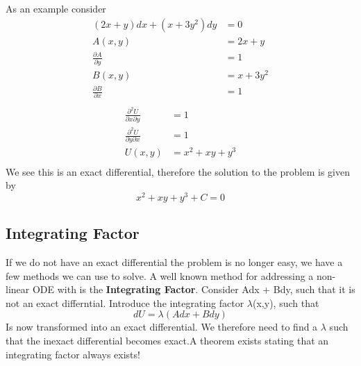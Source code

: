 \documentclass{article}
\newcommand{\be}{\begin{equation}}
\newcommand{\ee}{\end{equation}}
\newcommand{\pd}{\partial}
\begin{document}
As an example consider
\be
\begin{split}
(2x+y)dx + (x+3y^2)dy &= 0 \\
A(x,y) & = 2x+y  \\
\frac{\partial A}{\partial y} &= 1 \\
B(x,y) & = x+ 3y^2  \\
\frac{\partial B}{\partial x} &= 1 \\
\end{split}
\ee
\be
\begin{split}
    \frac{\pd ^2 U}{\pd x \pd y} &= 1\\
    \frac{\pd ^2 U}{\pd y \pd x} &= 1\\
    U(x,y) &= x^2 + xy + y^3\\
\end{split}
\ee
We see this is an exact differential, therefore the solution to the problem is given  by
\be
x^2 + xy + y^3 + C = 0
\ee
\subsection*{Integrating Factor}
If we do not have an exact differential the problem is no longer easy, we have a few methods we can use to solve.
A well known method for addressing a non-linear ODE with is the \textbf{Integrating Factor}.
Consider Adx + Bdy, such that it is not an exact differntial.
Introduce the integrating factor $\lambda$(x,y), such that
\be
dU = \lambda(Adx + Bdy)
\ee
Is now transformed into an exact differential.
We therefore need to find a $\lambda$ such that the inexact differential becomes exact.A theorem exists stating that an integrating factor always exists!
\end{document}
